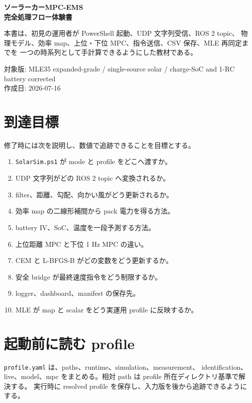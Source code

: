 
\begin{titlepage}
\centering
{\Huge\bfseries ソーラーカーMPC-EMS\\完全処理フロー体験書\par}
\vspace{8mm}
{\Large \editionlabel\par}
\vspace{10mm}
\begin{tcolorbox}[colback=white,colframe=black,width=0.92\textwidth]
本書は、初見の運用者が PowerShell 起動、UDP 文字列受信、ROS 2 topic、
物理モデル、効率 map、上位・下位 MPC、指令送信、CSV 保存、MLE 再同定までを
一つの時系列として手計算できるようにした教材である。
\end{tcolorbox}
\vfill
対象版: MLE35 expanded-grade / single-source solar / charge-SoC and 1-RC battery corrected\\
作成日: 2026-07-16
\end{titlepage}
\tableofcontents
\newpage

\section{到達目標}
修了時には次を説明し、数値で追跡できることを目標とする。
\begin{enumerate}
  \item \verb|SolarSim.ps1| が mode と profile をどこへ渡すか。
  \item UDP 文字列がどの ROS 2 topic へ変換されるか。
  \item filter、距離、勾配、向かい風がどう更新されるか。
  \item 効率 map の二線形補間から pack 電力を得る方法。
  \item battery IV、SoC、温度を一段予測する方法。
  \item 上位距離 MPC と下位 1 Hz MPC の違い。
  \item CEM と L-BFGS-B がどの変数をどう更新するか。
  \item 安全 bridge が最終速度指令をどう制限するか。
  \item logger、dashboard、manifest の保存先。
  \item MLE が map と scalar をどう実運用 profile に反映するか。
\end{enumerate}

\section{起動前に読む profile}
\begin{tcolorbox}[title=一つの source of truth]
\verb|profile.yaml| は、paths、runtime、simulation、measurement、
identification、live、model、mpc をまとめる。相対 path は profile 所在ディレクトリ基準で解決する。
実行時に resolved profile を保存し、入力版を後から追跡できるようにする。
\end{tcolorbox}

